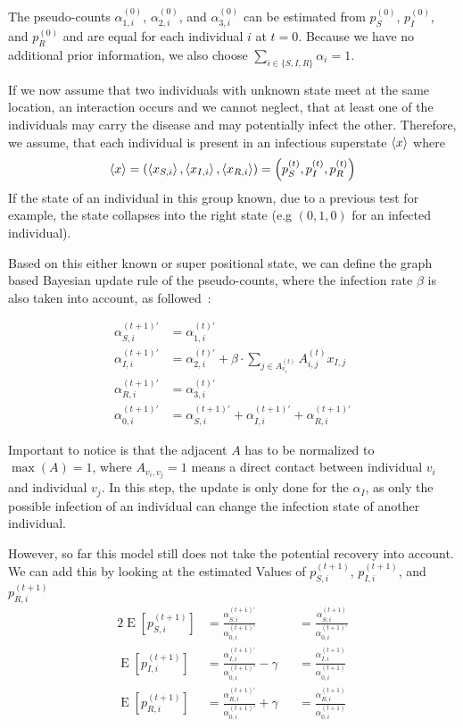 The pseudo-counts $\alpha_{1,i}^{(0)}$, $\alpha_{2,i}^{(0)}$, and $\alpha_{3,i}^{(0)}$ can be estimated from $p_S^{(0)}$, $p_I^{(0)}$, and $p_R^{(0)}$ and are equal for each individual $i$ at $t=0$. Because we have no additional prior information, we also choose $\sum_{i\in\{S,I,R\}}\alpha_i = 1$.

If we now assume that two individuals with unknown state meet at the same location, an interaction occurs and we cannot neglect, that at least one of the individuals may carry the disease and may potentially infect the other. Therefore, we assume, that each individual is present in an infectious superstate $\braket{x}$ where
\begin{equation}
    \braket{x} = \left(\braket{x_{S,i}}, \braket{x_{I,i}}, \braket{x_{R,i}}\right) = \left(p_S^{(t)},p_I^{(t)},p_R^{(t)}\right)
\end{equation}
If the state of an individual in this group known, due to a previous test for example, the state collapses into the right state (e.g $(0,1,0)$ for an infected individual).

Based on this either known or super positional state, we can define the graph based Bayesian update rule of the pseudo-counts, where the infection rate $\beta$ is also taken into account, as followed~\cite{rice2006mathematical}:

\begin{align}
    \alpha_{S,i}^{(t+1)\prime} &= \alpha_{1,i}^{(t)\prime}\\
    \alpha_{I,i}^{(t+1)\prime} &= \alpha_{2,i}^{(t)\prime} + \beta \cdot
    \sum_{j\in A^{(t)}_{v_i}} A^{(t)}_{i,j} x_{I,j}\\
    \alpha_{R,i}^{(t+1)\prime} &= \alpha_{3,i}^{(t)\prime}\\
    \alpha_{0,i}^{(t+1)\prime} &= \alpha_{S,i}^{(t+1)\prime}+\alpha_{I,i}^{(t+1)\prime}+\alpha_{R,i}^{(t+1)\prime}
\end{align}

Important to notice is that the adjacent $A$ has to be normalized to $\operatorname{max}(A)=1$, where $A_{v_i,v_j}=1$ means a direct contact between individual $v_i$ and individual $v_j$.
In this step, the update is only done for the $\alpha_I$, as only the possible infection of an individual can change the infection state of another individual.

However, so far this model still does not take the potential recovery into account. We can add this by looking at the estimated Values of $p_{S,i}^{(t+1)}$, $p_{I,i}^{(t+1)}$, and $p_{R,i}^{(t+1)}$ 
\begin{alignat}{2}
    \operatorname{E}[p_{S,i}^{(t+1)}] &= \frac{\alpha_{S,i}^{(t+1)\prime}}{\alpha_{0,i}^{(t+1)\prime}} & &= \frac{\alpha_{S,i}^{(t+1)}}{\alpha_{0,i}^{(t+1)\prime}} \\
    \operatorname{E}[p_{I,i}^{(t+1)}]&= \frac{\alpha_{I,i}^{(t+1)\prime}}{\alpha_{0,i}^{(t+1)\prime}}-\gamma & &=\frac{\alpha_{I,i}^{(t+1)}}{\alpha_{0,i}^{(t+1)}} \\
    \operatorname{E}[p_{R,i}^{(t+1)}]&= \frac{\alpha_{R,i}^{(t+1)\prime}}{\alpha_{0,i}^{(t+1)\prime}}+\gamma & &= \frac{\alpha_{R,i}^{(t+1)}}{\alpha_{0,i}^{(t+1)}}
\end{alignat}

